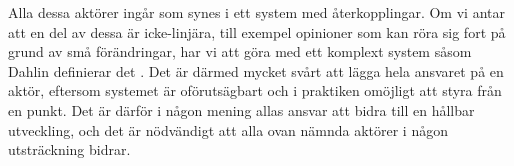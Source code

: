 \documentclass{article}
\begin{document}
Alla dessa aktörer ingår som synes i ett system med återkopplingar. Om vi antar att en del av dessa är icke-linjära, till exempel opinioner som kan röra sig fort på grund av små förändringar, har vi att göra med ett komplext system såsom Dahlin definierar det . Det är därmed mycket svårt att lägga hela ansvaret på en aktör, eftersom systemet är oförutsägbart och i praktiken omöjligt att styra från en punkt. Det är därför i någon mening allas ansvar att bidra till en hållbar utveckling, och det är nödvändigt att alla ovan nämnda aktörer i någon utsträckning bidrar.

\end{document}
